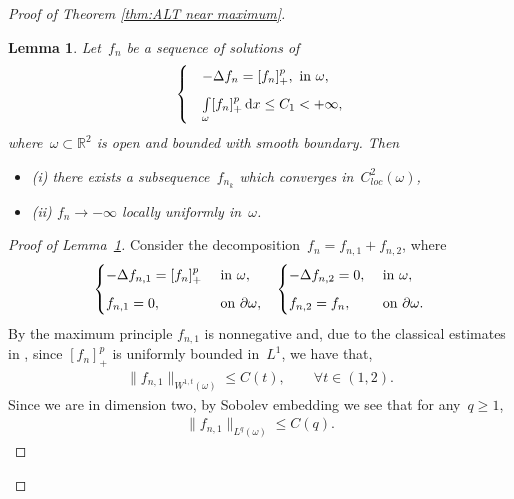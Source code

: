 \documentclass[10pt]{amsart}
\newcommand{\R}{\mathbb{R}}
\newcommand{\dd}{\mathop{}\!\mathrm{d}}
\def\R{\mathbb{R}}
\renewcommand{\to}{\rightarrow}
\newtheorem{lemma}[theorem]{Lemma}
\begin{document}
\begin{proof}[Proof of Theorem \ref{thm:ALT near maximum}]
        \begin{lemma}\label{lemma:ALT by Harnack}
            Let~$f_n$ be a sequence of solutions of
            \begin{align*}
                \begin{cases}
                     &-\Delta f_n = [f_n]_+^p, \mbox{ in } \omega, \vspace{2mm} \\
                    &\int\limits_{\omega} [f_n]_+^p \dd{x}\leq C_1 <+\infty,
                \end{cases}
            \end{align*}
            where~$\omega\subset \R^2$ is open and bounded with smooth boundary.
            Then
            \begin{itemize}
                \item[either] {\rm (i)} there exists a subsequence~$f_{n_k}$ which converges in~$C^2_{loc}(\omega)$,

                \item[or $\quad$] {\rm (ii)} $f_n\to -\infty$ locally uniformly in~$\omega$.
            \end{itemize}
        \end{lemma}
         \begin{proof}[Proof of Lemma~\ref{lemma:ALT by Harnack}]
        Consider the decomposition~$f_n= f_{n,1}+ f_{n,2}$, where
        \begin{align*}
            \begin{cases}
                -\Delta f_{n,1}= [f_n]_+^p & \mbox{ in  } \omega, \vspace{2mm} \\
                f_{n,1}=0, & \mbox{ on } \partial \omega,
            \end{cases}
            & &
            \begin{cases}
                -\Delta f_{n,2}=0 ,& \mbox{ in  } \omega, \vspace{2mm} \\
                f_{n,2}=f_n, & \mbox{ on } \partial \omega.
            \end{cases}
        \end{align*}
      By the maximum principle $f_{n,1}$ is nonnegative and, due to the classical estimates in \cite{stam}, since
      $[f_n]_+^p$ is uniformly bounded in~$L^1$, we have that,
        \begin{align*}
            \|f_{n,1}\|_{W^{1,t}(\omega)} \leq C(t), \qquad \forall t\in(1,2).
        \end{align*}
         Since we are in dimension two, by Sobolev embedding we see that for any~$q\geq 1$,
        \begin{align*}
            \|f_{n,1}\|_{L^q(\omega)} \leq C(q).
        \end{align*}


\end{proof}
\end{proof}
\end{document}
